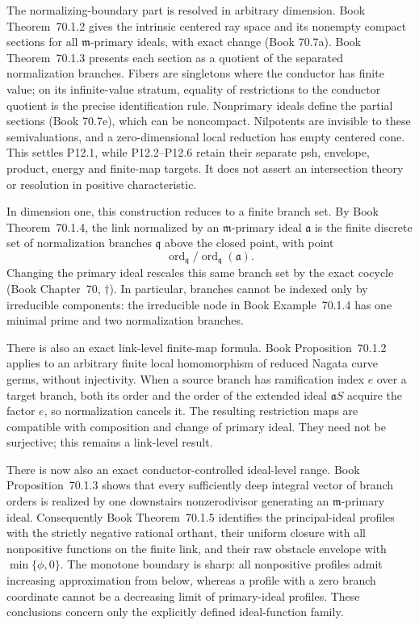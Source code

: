 \documentclass[11pt,a4paper]{article}
\theoremstyle{definition}
\theoremstyle{remark}
\begin{document}
The normalizing-boundary part is resolved in arbitrary dimension.
Book Theorem~70.1.2 gives the intrinsic centered ray
space and its nonempty compact sections for all \(\mathfrak m\)-primary
ideals, with exact change \textup{(Book 70.7a)}.
Book Theorem~70.1.3 presents each section as a
quotient of the separated normalization branches. Fibers are singletons
where the conductor has finite value; on its infinite-value stratum,
equality of restrictions to the conductor quotient is the precise
identification rule. Nonprimary ideals define the partial sections
\textup{(Book 70.7e)}, which can be noncompact.
Nilpotents are invisible to these semivaluations, and a zero-dimensional
local reduction has empty centered cone. This settles P12.1, while
P12.2--P12.6 retain their separate psh, envelope, product, energy and
finite-map targets. It does not assert an intersection theory or
resolution in positive characteristic.

In dimension one, this construction reduces to a finite branch set. By
Book Theorem~70.1.4, the link normalized by an
\(\mathfrak m\)-primary ideal \(\mathfrak a\) is the finite discrete set of
normalization branches \(\mathfrak q\) above the closed point, with point
\[
  \operatorname{ord}_{\mathfrak q}/
  \operatorname{ord}_{\mathfrak q}(\mathfrak a).
\]
Changing the primary ideal rescales this same branch set by the exact
cocycle \textup{(Book Chapter~70, \(\dagger \))}.  In particular, branches
cannot be indexed only by irreducible components: the irreducible node in
Book Example~70.1.4 has one minimal prime and two
normalization branches.

There is also an exact link-level finite-map formula.
Book Proposition~70.1.2 applies to an arbitrary finite
local homomorphism of reduced Nagata curve germs, without injectivity.  When
a source branch has ramification index \(e\) over a target branch, both its
order and the order of the extended ideal \(\mathfrak aS\) acquire the
factor \(e\), so normalization cancels it.  The resulting restriction maps
are compatible with composition and change of primary ideal.  They need not
be surjective; this remains a link-level result.

There is now also an exact conductor-controlled ideal-level range.
Book Proposition~70.1.3 shows that every
sufficiently deep integral vector of branch orders is realized by one
downstairs nonzerodivisor generating an \(\mathfrak m\)-primary ideal.
Consequently Book Theorem~70.1.5 identifies the
principal-ideal profiles with the strictly negative rational orthant, their
uniform closure with all nonpositive functions on the finite link, and their
raw obstacle envelope with \(\min\{\phi,0\}\).  The monotone boundary is
sharp: all nonpositive profiles admit increasing approximation from below,
whereas a profile with a zero branch coordinate cannot be a decreasing limit
of primary-ideal profiles.  These conclusions concern only the explicitly
defined ideal-function family.
\end{document}
